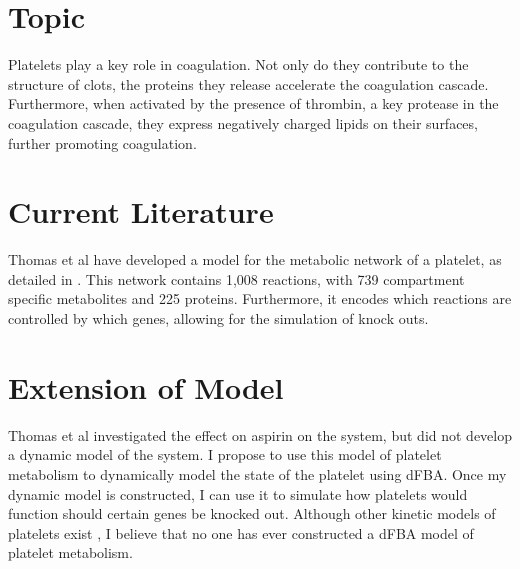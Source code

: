 \documentclass{article}
\begin{document}
\section*{Topic}
Platelets play a key role in coagulation. Not only do they contribute to the structure of clots, the proteins they release accelerate the coagulation cascade. Furthermore, when activated by the presence of thrombin, a key protease in the coagulation cascade, they express negatively charged lipids on their surfaces, further promoting coagulation.
\section*{Current Literature}
Thomas et al have developed a model for the metabolic network of a platelet, as detailed in \cite{thomas2014network}. This network contains 1,008 reactions, with 739 compartment specific metabolites and 225 proteins. Furthermore, it encodes which reactions are controlled by which genes, allowing for the simulation of knock outs. 
\section*{Extension of Model}
Thomas et al investigated the effect on aspirin on the system, but did not develop a dynamic model of the system. I propose to use this model of platelet metabolism to dynamically model the state of the platelet using dFBA. Once my dynamic model is constructed, I can use it to simulate how platelets would function should certain genes be knocked out. Although other kinetic models of platelets exist  \cite{ashby1989model}, I believe that no one has ever constructed a dFBA model of platelet metabolism. 



\end{document}
